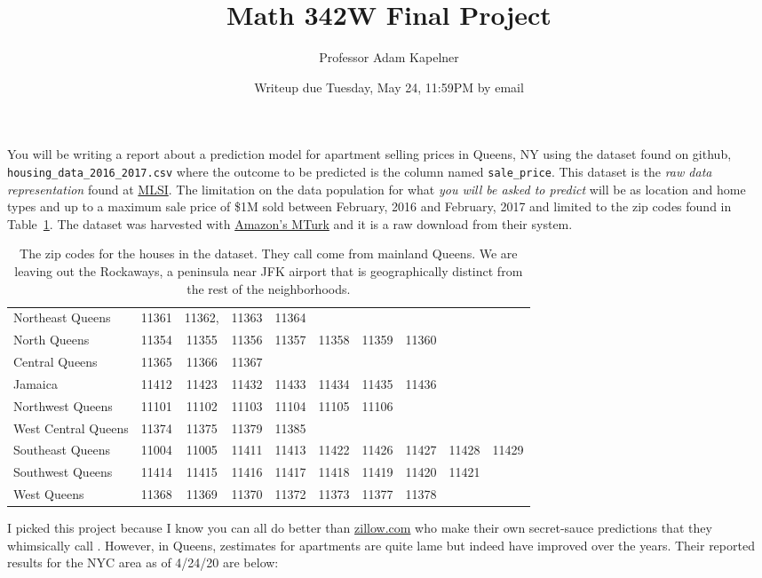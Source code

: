 \documentclass[12pt]{article}
\title{Math 342W Final Project \the\year}
\author{Professor Adam Kapelner}
\date{Writeup due Tuesday, May 24, 11:59PM by email}
\begin{document}
\maketitle

You will be writing a report about a prediction model for apartment selling prices in Queens, NY using the dataset found on github, \texttt{housing\_data\_2016\_2017.csv} where the outcome to be predicted is the column named \texttt{sale\_price}. This dataset is the \emph{raw data representation} found at \href{http://www.mlsli.com/}{MLSI}. The limitation on the data population for what \emph{you will be asked to predict} will be  as location and home types  and  up to a maximum sale price of \$1M sold between February, 2016 and February, 2017 and limited to the zip codes found in Table~\ref{tab:zips}. The dataset was harvested with \href{mturk.com}{Amazon's MTurk} and it is a raw download from their system.


\begin{table}[htp]
\centering\footnotesize
\begin{tabular}{l|ccccccccc}
\hline
Northeast Queens		&11361& 11362,& 11363& 11364 \\
North Queens		&11354& 11355& 11356& 11357& 11358& 11359& 11360 \\
Central Queens		&11365& 11366& 11367 \\
Jamaica				&11412& 11423& 11432& 11433& 11434& 11435& 11436 \\
Northwest Queens	&11101& 11102& 11103& 11104& 11105& 11106 \\
West Central Queens	&11374& 11375& 11379& 11385 \\
Southeast Queens		&11004& 11005& 11411& 11413& 11422& 11426& 11427& 11428& 11429 \\
Southwest Queens	&11414& 11415& 11416& 11417& 11418& 11419& 11420& 11421 \\
West Queens			&11368& 11369& 11370& 11372& 11373& 11377& 11378 \\\hline
\end{tabular}
\label{tab:zips}
\caption{The zip codes for the houses in the dataset. They call come from mainland Queens. We are leaving out the Rockaways, a peninsula near JFK airport that is geographically distinct from the rest of the neighborhoods.}
\end{table}

I picked this project because I know you can all do better than \url{zillow.com} who make their own secret-sauce predictions that they whimsically call . However, in Queens, zestimates for apartments are quite lame but indeed have improved over the years. Their reported results for the NYC area as of 4/24/20 are below:
\end{document}
